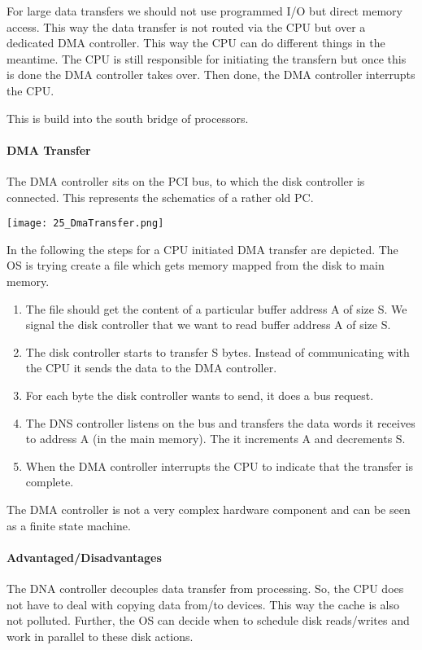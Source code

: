 

For large data transfers we should not use programmed I/O but direct memory access. This way the data transfer is not routed via the CPU but over a dedicated DMA controller. This way the CPU can do different things in the meantime. The CPU is still responsible for initiating the transfern but once this is done the DMA controller takes over. Then done, the DMA controller interrupts the CPU.

This is build into the south bridge of processors.

\paragraph{DMA Transfer}
The DMA controller sits on the PCI bus, to which the disk controller is connected. This represents the schematics of a rather old PC.

\texttt{[image: 25\_DmaTransfer.png]}

In the following the steps for a CPU initiated DMA transfer are depicted. The OS is trying create a file which gets memory mapped from the disk to main memory.

\begin{enumerate}
    \item The file should get the content of a particular buffer address A of size S. We signal the disk controller that we want to read buffer address A of size S.
    \item The disk controller starts to transfer S bytes. Instead of communicating with the CPU it sends the data to the DMA controller.
    \item For each byte the disk controller wants to send, it does a bus request.
    \item The DNS controller listens on the bus and transfers the data words it receives to address A (in the main memory). The it increments A and decrements S.
    \item When  the DMA controller interrupts the CPU to indicate that the transfer is complete.
\end{enumerate}

The DMA controller is not a very complex hardware component and can be seen as a finite state machine.

\paragraph{Advantaged/Disadvantages}
The DNA controller decouples data transfer from processing. So, the CPU does not have to deal with copying data from/to devices. This way the cache is also not polluted. Further, the OS can decide when to schedule disk reads/writes and work in parallel to these disk actions.

